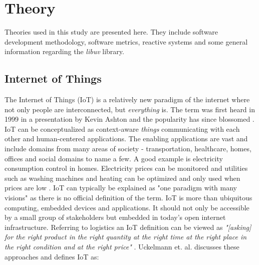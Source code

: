 \chapter{Theory}
\label{cha:theory}

Theories used in this study are presented here. They include software
development methodology, software metrics, reactive systems and some general
information regarding the \textit{libuv} library.

\section{Internet of Things}



The Internet of Things (IoT) is a relatively new paradigm of the internet where
not only people are interconnected, but \textit{everything} is. The term was
first heard in 1999 in a presentation by Kevin Ashton \cite{ashton2011internet}
and the popularity has since blossomed \cite{gubbi2013internet}. IoT can be
conceptualized as context-aware \textit{things} communicating with each other
and human-centered applications. The enabling applications are vast and include
domains from many areas of society - transportation, healthcare, homes, offices
and social domains to name a few. A good example is electricity consumption
control in homes. Electricity prices can be monitored and utilities such as
washing machines and heating can be optimized and only used when prices are low
\cite{atzori2010internet}. IoT can typically be explained as "one paradigm with
many visions" \cite{atzori2010internet} as there is no official definition of
the term. IoT is more than ubiquitous computing, embedded devices and
applications. It should not only be accessible by a small group of stakeholders
but embedded in today's open internet infrastructure. Referring to logistics an
IoT definition can be viewed as \textit{"[asking] for the right product in the
right quantity at the right time at the right place in the right condition and
at the right price"} \cite{uckelmann2011architectural}. Uckelmann et. al.
discusses these approaches and defines IoT as:

